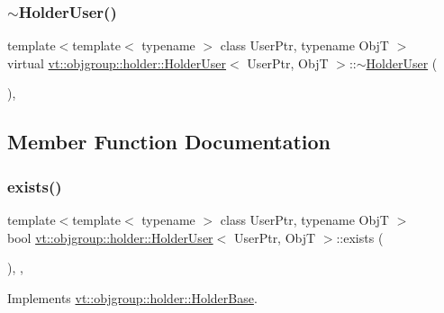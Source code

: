\subsubsection{\texorpdfstring{$\sim$\+Holder\+User()}{~HolderUser()}}
{\footnotesize\ttfamily template$<$template$<$ typename $>$ class User\+Ptr, typename ObjT $>$ \\
virtual \hyperlink{structvt_1_1objgroup_1_1holder_1_1_holder_user}{vt\+::objgroup\+::holder\+::\+Holder\+User}$<$ User\+Ptr, ObjT $>$\+::$\sim$\hyperlink{structvt_1_1objgroup_1_1holder_1_1_holder_user}{Holder\+User} (\begin{DoxyParamCaption}{ }\end{DoxyParamCaption})\hspace{0.3cm}{\ttfamily [virtual]}, {\ttfamily [default]}}



\subsection{Member Function Documentation}
\mbox{\label{structvt_1_1objgroup_1_1holder_1_1_holder_user_abba92cc4a99e045b64a1865fe1477fb2}} 
\subsubsection{\texorpdfstring{exists()}{exists()}}
{\footnotesize\ttfamily template$<$template$<$ typename $>$ class User\+Ptr, typename ObjT $>$ \\
bool \hyperlink{structvt_1_1objgroup_1_1holder_1_1_holder_user}{vt\+::objgroup\+::holder\+::\+Holder\+User}$<$ User\+Ptr, ObjT $>$\+::exists (\begin{DoxyParamCaption}{ }\end{DoxyParamCaption})\hspace{0.3cm}{\ttfamily [inline]}, {\ttfamily [override]}, {\ttfamily [virtual]}}



Implements \hyperlink{structvt_1_1objgroup_1_1holder_1_1_holder_base_afeebbe358baf0b2bfea57f52807be564}{vt\+::objgroup\+::holder\+::\+Holder\+Base}.

\mbox{\label{structvt_1_1objgroup_1_1holder_1_1_holder_user_a102b494316b9f906a02f1c47b797e339}} 
